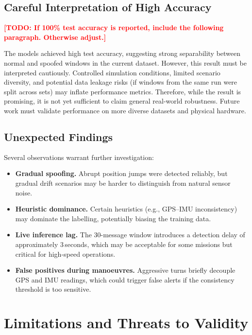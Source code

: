 \documentclass[11pt,a4paper]{article}
\newcommand{\todo}[1]{\textcolor{red}{\textbf{[TODO: #1]}}}
\begin{document}
\subsection{Careful Interpretation of High Accuracy}

\todo{If 100\% test accuracy is reported, include the following paragraph. Otherwise adjust.}

The models achieved high test accuracy, suggesting strong separability between normal and spoofed windows in the current dataset. However, this result must be interpreted cautiously. Controlled simulation conditions, limited scenario diversity, and potential data leakage risks (if windows from the same run were split across sets) may inflate performance metrics. Therefore, while the result is promising, it is not yet sufficient to claim general real-world robustness. Future work must validate performance on more diverse datasets and physical hardware.

\subsection{Unexpected Findings}

Several observations warrant further investigation:
\begin{itemize}
    \item \textbf{Gradual spoofing.} Abrupt position jumps were detected reliably, but gradual drift scenarios may be harder to distinguish from natural sensor noise.
    \item \textbf{Heuristic dominance.} Certain heuristics (e.g., GPS--IMU inconsistency) may dominate the labelling, potentially biasing the training data.
    \item \textbf{Live inference lag.} The 30-message window introduces a detection delay of approximately 3\,seconds, which may be acceptable for some missions but critical for high-speed operations.
    \item \textbf{False positives during manoeuvres.} Aggressive turns briefly decouple GPS and IMU readings, which could trigger false alerts if the consistency threshold is too sensitive.
\end{itemize}

\section{Limitations and Threats to Validity}
\end{document}
